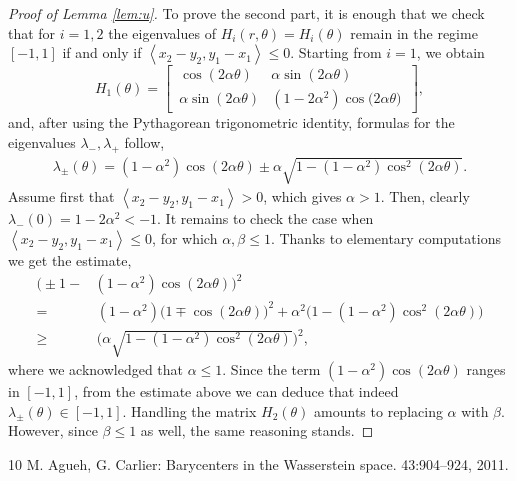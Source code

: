 \documentclass[11pt,letterpaper,reqno]{amsart}
\theoremstyle{definition}
\numberwithin{equation}{section}
\newcommand{\pairing}[1]{{\left \langle #1 \right \rangle}}
\begin{document}
{\begin{proof}[Proof of Lemma \ref{lem:u}]
	To prove the second part, it is enough that we check that for $i=1,2$ the eigenvalues 
	of $H_i(r,\theta) = H_i(\theta)$ remain in the regime $[-1,1]$ if and only if $\pairing{x_2-y_2,y_1-x_1} \leq 0$. Starting from $i = 1$, we obtain
		\begin{equation*}
		H_1(\theta) = 
		\begin{bmatrix}
			\, \cos(2\alpha \theta) &  \alpha  \sin(2\alpha \theta) \\
			\, \alpha \sin(2\alpha \theta)  & (1- 2\alpha^2) \cos\big(2\alpha \theta\big) \,
		\end{bmatrix},
	\end{equation*}
	and, after using the Pythagorean trigonometric identity, formulas for the eigenvalues  $\lambda_-, \lambda_+$  follow,
	\begin{align*}
		\lambda_{\pm} (\theta) 
		=  (1-\alpha^2) \cos(2\alpha\theta) \pm \alpha  \sqrt{1- (1-\alpha^2)  \cos^2(2\alpha \theta)  }.
	\end{align*}
	Assume first that $\pairing{x_2-y_2,y_1-x_1}  > 0$, which gives $\alpha > 1$. Then, clearly $\lambda_-(0) = 1- 2\alpha^2 <-1$.
	It remains to check the case when $\pairing{x_2-y_2,y_1-x_1}  \leq 0$, for which $\alpha,\beta \leq 1$.  Thanks to elementary computations we get the estimate,
	\begin{align*}
		\Big(\pm1 - &(1-\alpha^2)  \cos(2\alpha \theta) \Big)^2 \\
		=& \, (1-\alpha^2) \big(1 \mp \cos(2\alpha \theta) \big)^2 +\alpha^2 \big(1- (1-\alpha^2)  \cos^2(2\alpha \theta) \big)\\
		\geq &\,  \Big( \alpha  \sqrt{1- (1-\alpha^2)  \cos^2(2\alpha \theta)}\Big)^2,
	\end{align*}
	where we acknowledged that $\alpha \leq 1$. 
	Since the term $(1-\alpha^2)  \cos(2\alpha \theta)$ ranges in $[-1,1]$, from the estimate above we can deduce that indeed $\lambda_{\pm}(\theta)\in [-1,1]$. Handling the matrix $H_2(\theta)$ amounts to replacing $\alpha$ with $\beta$. However, since $\beta\leq 1$ as well, the same reasoning stands. 
\end{proof}

\smallskip






\begin{thebibliography}{10}
	M. Agueh, G. Carlier:
	\newblock Barycenters in the Wasserstein space.
	 43:904--924, 2011.
	

\end{thebibliography}}
\end{document}
